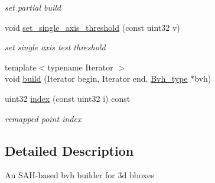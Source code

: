 \begin{DoxyCompactItemize}
\begin{DoxyCompactList}\small\item\em set partial build \end{DoxyCompactList}\item 
\hypertarget{classnih_1_1deprecated_1_1_bvh__sah__builder_afb381e7c565a7af2023bc7d921de195d}{
void \hyperlink{classnih_1_1deprecated_1_1_bvh__sah__builder_afb381e7c565a7af2023bc7d921de195d}{set\-\_\-single\-\_\-axis\-\_\-threshold} (const uint32 v)}
\label{classnih_1_1deprecated_1_1_bvh__sah__builder_afb381e7c565a7af2023bc7d921de195d}

\begin{DoxyCompactList}\small\item\em set single axis test threshold \end{DoxyCompactList}\item 
{\footnotesize template$<$typename Iterator $>$ }\\void \hyperlink{classnih_1_1deprecated_1_1_bvh__sah__builder_a7fb4a776c2409db6e3db887fc49b7023}{build} (\-Iterator begin, \-Iterator end, \hyperlink{structnih_1_1_bvh}{\-Bvh\-\_\-type} $\ast$bvh)
\item 
\hypertarget{classnih_1_1deprecated_1_1_bvh__sah__builder_aa395159698f1df15ce08d87ff297fe2d}{
uint32 \hyperlink{classnih_1_1deprecated_1_1_bvh__sah__builder_aa395159698f1df15ce08d87ff297fe2d}{index} (const uint32 i) const }
\label{classnih_1_1deprecated_1_1_bvh__sah__builder_aa395159698f1df15ce08d87ff297fe2d}

\begin{DoxyCompactList}\small\item\em remapped point index \end{DoxyCompactList}\end{DoxyCompactItemize}


\subsection{\-Detailed \-Description}
\-An \-S\-A\-H-\/based bvh builder for 3d bboxes 

